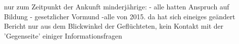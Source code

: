 nur zum Zeitpunkt der Ankunft minderjährige:
    - alle hatten Anspruch auf Bildung
    - gesetzlicher Vormund
    -alle von 2015. da hat sich eineiges geändert
Bericht nur aus dem Blickwinkel der Geflüchteten, kein Kontakt mit der 'Gegenseite' einiger Informationsfragen
